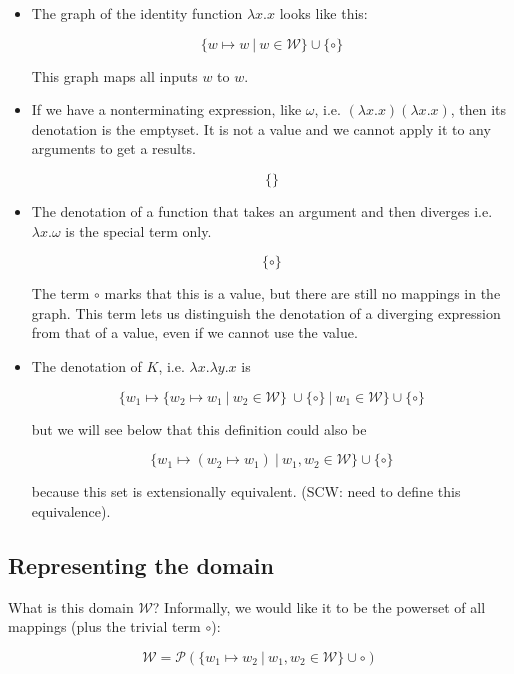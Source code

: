 \documentclass{article}
\theoremstyle{definition}
\begin{document}
\begin{itemize}
\item The graph of the identity function $\lambda x.x$ looks like this:

\[ \{ w \mapsto w\ |\ w \in \mathcal{W} \} \cup \{ \circ \} \]

This graph maps all inputs $w$ to $w$. 

\item If we have a nonterminating expression, like $\omega$, i.e. 
  $(\lambda x.x)(\lambda x.x)$,
  then its denotation is the emptyset.  It is not
  a value and we cannot apply it to any arguments to get a results.

   \[ \{\} \]

\item The denotation of a function that takes an argument and then diverges
  i.e. $\lambda x. \omega$ is the special term only.

  \[ \{ \circ \} \]

  The term $\circ$ marks that this is a value, but there are still no mappings
  in the graph. This term lets us distinguish the denotation of a diverging
  expression from that of a value, even if we cannot use the value.

\item The denotation of $K$, i.e. $\lambda x.\lambda y.x$ is  

  \[ \{ w_1 \mapsto \{ w_2 \mapsto w_1\ |\ w_2 \in \mathcal{W} \}\ \cup \{\circ\}\ |\ w_1 \in \mathcal{W} \} \cup \{ \circ \} \]

\noindent but we will see below that this definition could also be 

  \[ \{ w_1 \mapsto (w_2 \mapsto w_1)\ |\ w_1, w_2 \in \mathcal{W} \} \cup \{ \circ \} \]

because this set is extensionally equivalent. (SCW: need to define this equivalence).

\end{itemize}

\subsection{Representing the domain}

What is this domain $\mathcal{W}$? Informally, we would like it to be the
powerset of all mappings (plus the trivial term $\circ$):

\[ \mathcal{W} = \mathscr{P}( 
  \{ w_1 \mapsto w_2\ |\ w_1, w_2 \in \mathcal{W} \} \cup \circ )  \] 
\end{document}
